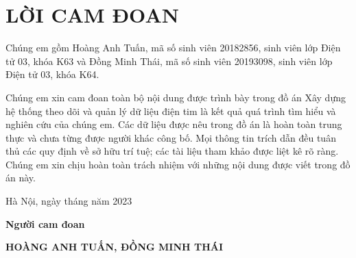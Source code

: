 \section*{LỜI CAM ĐOAN} %
\thispagestyle{empty}

Chúng em gồm Hoàng Anh Tuấn, mã số sinh viên 20182856, sinh viên lớp Điện tử 03, khóa K63 và Đồng Minh Thái, mã số sinh viên 20193098, sinh viên lớp Điện tử 03, khóa K64.

Chúng em xin cam đoan toàn bộ nội dung được trình bày trong đồ án Xây dựng hệ thống theo dõi và quản lý dữ liệu điện tim là kết quả quá trình tìm hiểu và
nghiên cứu của chúng em. Các dữ liệu được nêu trong đồ án là hoàn toàn trung thực
và chưa từng được người khác công bố. Mọi thông tin trích dẫn đều tuân thủ các quy
định về sở hữu trí tuệ; các tài liệu tham khảo được liệt kê rõ ràng. Chúng em xin
chịu hoàn toàn trách nhiệm với những nội dung được viết trong đồ án này.


\vspace{6pt}

\hspace{8cm}Hà Nội, ngày  tháng   năm 2023

\hspace{9cm}\textbf{Người cam đoan}

\vspace{1cm}
\hspace{7cm}\textbf{HOÀNG ANH TUẤN, ĐỒNG MINH THÁI}

\cleardoublepage
